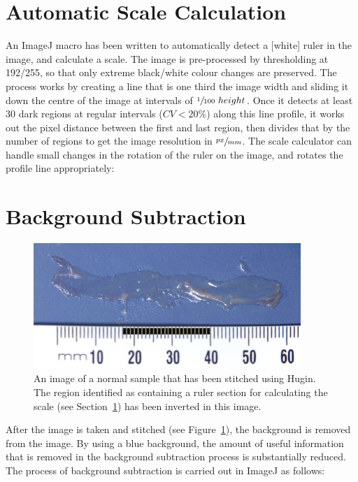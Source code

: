 \documentclass[a4paper]{scrartcl}
\begin{document}
\section{Automatic Scale Calculation}
\label{sec:scale-calc}


An ImageJ macro has been written to automatically detect a [white]
ruler in the image, and calculate a scale. The image is pre-processed
by thresholding at 192/255, so that only extreme black/white colour
changes are preserved. The process works by creating a line that is
one third the image width and sliding it down the centre of the image
at intervals of $\sfrac{1}{100}~height$. Once it detects at least 30
dark regions at regular intervals ($CV < 20\%$) along this line
profile, it works out the pixel distance between the first and last
region, then divides that by the number of regions to get the image
resolution in $\sfrac{px}{mm}$. The scale calculator can handle small
changes in the rotation of the ruler on the image, and rotates the
profile line appropriately:



\section{Background Subtraction}

\begin{figure}
  \centering
  \includegraphics[width=0.9\textwidth]{illustrations/small_DkrPaint.jpg}
  \caption{An image of a normal sample that has been stitched using
    Hugin. The region identified as containing a ruler section for
    calculating the scale (see Section~\ref{sec:scale-calc}) has been
    inverted in this image.}
  \label{fig:stitched-image}
\end{figure}

After the image is taken and stitched (see
Figure~\ref{fig:stitched-image}), the background is removed from the
image. By using a blue background, the amount of useful information
that is removed in the background subtraction process is substantially
reduced. The process of background subtraction is carried out in
ImageJ as follows:
\end{document}
